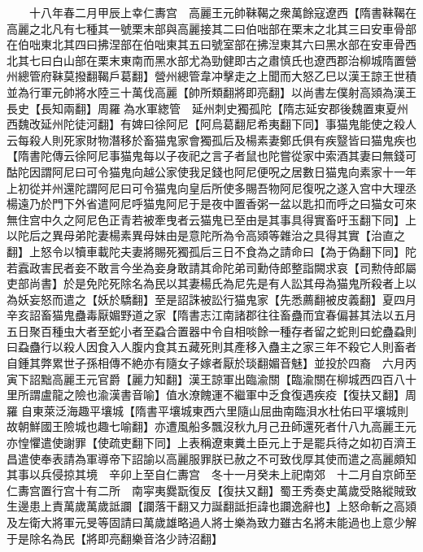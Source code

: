 　　十八年春二月甲辰上幸仁夀宫　高麗王元帥靺鞨之衆萬餘寇遼西【隋書靺鞨在高麗之北凡有七種其一號栗末部與高麗接其二曰伯咄部在栗末之北其三曰安車骨部在伯咄東北其四曰拂涅部在伯咄東其五曰號室部在拂湼東其六曰黑水部在安車骨西北其七曰白山部在栗末東南而黑水部尤為勁健即古之肅慎氏也遼西郡治柳城隋置營州總管府靺莫撥翻鞨戶葛翻】營州總管韋冲擊走之上聞而大怒乙巳以漢王諒王世積並為行軍元帥將水陸三十萬伐高麗【帥所類翻將即亮翻】以尚書左僕射高熲為漢王長史【長知兩翻】周羅為水軍緫管　延州刺史獨孤陀【隋志延安郡後魏置東夏州西魏改延州陀徒河翻】有婢曰徐阿尼【阿烏葛翻尼希夷翻下同】事猫鬼能使之殺人云每殺人則死家財物潛移於畜猫鬼家會獨孤后及楊素妻鄭氏俱有疾毉皆曰猫鬼疾也【隋書陀傳云徐阿尼事猫鬼每以子夜祀之言子者鼠也陀嘗從家中索酒其妻曰無錢可酤陀因謂阿尼曰可令猫鬼向越公家使我足錢也阿尼便呪之居數日猫鬼向素家十一年上初從并州還陀謂阿尼曰可令猫鬼向皇后所使多賜吾物阿尼復呪之遂入宫中大理丞楊遠乃於門下外省遣阿尼呼猫鬼阿尼于是夜中置香粥一盆以匙扣而呼之曰猫女可來無住宫中久之阿尼色正青若被牽曳者云猫鬼已至由是其事具得實畜吁玉翻下同】上以陀后之異母弟陀妻楊素異母妹由是意陀所為令高熲等雜治之具得其實【治直之翻】上怒令以犢車載陀夫妻將賜死獨孤后三日不食為之請命曰【為于偽翻下同】陀若蠧政害民者妾不敢言今坐為妾身敢請其命陀弟司勳侍郎整詣闕求哀【司勲侍郎屬吏部尚書】於是免陀死除名為民以其妻楊氏為尼先是有人訟其母為猫鬼所殺者上以為妖妄怒而遣之【妖於驕翻】至是詔誅被訟行猫鬼家【先悉薦翻被皮義翻】夏四月辛亥詔畜猫鬼蠱毒厭媚野道之家【隋書志江南諸郡往往畜蠱而宜春偏甚其法以五月五日聚百種虫大者至蛇小者至蝨合置器中令自相啖餘一種存者留之蛇則曰蛇蠱蝨則曰蝨蠱行以殺人因食入人腹内食其五藏死則其產移入蠱主之家三年不殺它人則畜者自鍾其弊累世子孫相傳不絶亦有隨女子嫁者厭於琰翻媚音魅】並投於四裔　六月丙寅下詔黜高麗王元官爵【麗力知翻】漢王諒軍出臨渝關【臨渝關在柳城西四百八十里所謂盧龍之險也渝漢書音喻】值水潦餽運不繼軍中乏食復遇疾疫【復扶又翻】周羅自東萊泛海趣平壤城【隋書平壤城東西六里隨山屈曲南臨浿水杜佑曰平壤城則故朝鮮國王險城也趣七喻翻】亦遭風船多飄沒秋九月己丑師還死者什八九高麗王元亦惶懼遣使謝罪【使疏吏翻下同】上表稱遼東糞土臣元上于是罷兵待之如初百濟王昌遣使奉表請為軍導帝下詔諭以高麗服罪朕已赦之不可致伐厚其使而遣之高麗頗知其事以兵侵掠其境　辛卯上至自仁夀宫　冬十一月癸未上祀南郊　十二月自京師至仁夀宫置行宫十有二所　南寜夷爨翫復反【復扶又翻】蜀王秀奏史萬歲受賂縱賊致生邊患上責萬歲萬歲詆讕【讕落干翻又力誕翻詆拒諱也讕逸辭也】上怒命斬之高熲及左衛大將軍元旻等固請曰萬歲雄略過人將士樂為致力雖古名將未能過也上意少解于是除名為民【將即亮翻樂音洛少詩沼翻】

